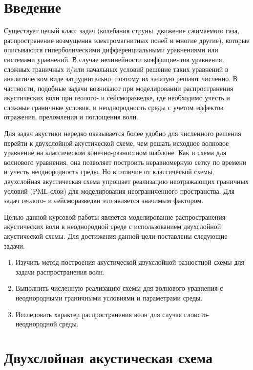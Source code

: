 \documentclass[a4paper, fontsize=14pt]{article}
\begin{document}

\newpage
\tableofcontents
\newpage
\section*{Введение}

Существует целый класс задач (колебания струны,
движение сжимаемого газа, распространение возмущения электромагнитных полей и многие другие), которые описываются гиперболическими дифференциальными уравнениями или системами уравнений. В случае нелинейности коэффициентов уравнения, сложных граничных и/или начальных условий решение таких уравнений в аналитическом виде затруднительно, поэтому их зачатую решают численно. В частности, подобные задачи возникают при моделировании распространения акустических волн при геолого- и сейсморазведке, где необходимо учесть и сложные граничные условия, и неоднородность среды с учетом эффектов отражения, преломления и поглощения волн.

Для задач акустики нередко оказывается более удобно для численного решения перейти к двухслойной акустической схеме, чем решать исходное волновое уравнение на классическом конечно-разностном шаблоне. Как и схема для волнового уравнения, она позволяет построить неравномерную сетку по времени и учесть неоднородность среды. Но в отличие от классической схемы, двухслойная акустическая схема упрощает реализацию неотражающих граничных условий (PML-слои) для моделирования неограниченного пространства. Для задач геолого- и сейсморазведки это является значимым фактором.

Целью данной курсовой работы является моделирование распространения акустических волн в неоднородной среде с использованием двухслойной акустической схемы. Для достижения данной цели поставлены следующие задачи.
\begin{enumerate}
    \item Изучить метод построения акустической двухслойной разностной схемы для задачи распространения волн. 
    \item Выполнить численную реализацию схемы для волнового уравнения с неоднородными граничными условиями и параметрами среды.
    \item Исследовать характер распространения волн для случая слоисто-неоднородной среды.
\end{enumerate}
\newpage
\section{Двухслойная акустическая схема}
\end{document}
